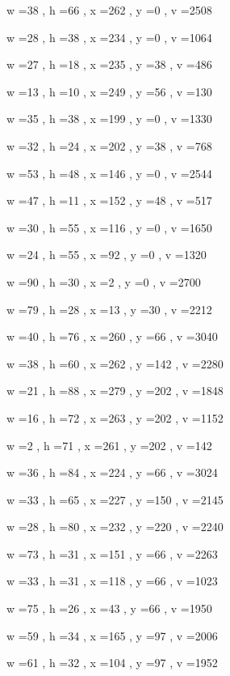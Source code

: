 \documentclass[11pt]{article}
\begin{document}
w =38 , h =66 , x =262 , y =0 , v =2508
\par
w =28 , h =38 , x =234 , y =0 , v =1064
\par
w =27 , h =18 , x =235 , y =38 , v =486
\par
w =13 , h =10 , x =249 , y =56 , v =130
\par
w =35 , h =38 , x =199 , y =0 , v =1330
\par
w =32 , h =24 , x =202 , y =38 , v =768
\par
w =53 , h =48 , x =146 , y =0 , v =2544
\par
w =47 , h =11 , x =152 , y =48 , v =517
\par
w =30 , h =55 , x =116 , y =0 , v =1650
\par
w =24 , h =55 , x =92 , y =0 , v =1320
\par
w =90 , h =30 , x =2 , y =0 , v =2700
\par
w =79 , h =28 , x =13 , y =30 , v =2212
\par
w =40 , h =76 , x =260 , y =66 , v =3040
\par
w =38 , h =60 , x =262 , y =142 , v =2280
\par
w =21 , h =88 , x =279 , y =202 , v =1848
\par
w =16 , h =72 , x =263 , y =202 , v =1152
\par
w =2 , h =71 , x =261 , y =202 , v =142
\par
w =36 , h =84 , x =224 , y =66 , v =3024
\par
w =33 , h =65 , x =227 , y =150 , v =2145
\par
w =28 , h =80 , x =232 , y =220 , v =2240
\par
w =73 , h =31 , x =151 , y =66 , v =2263
\par
w =33 , h =31 , x =118 , y =66 , v =1023
\par
w =75 , h =26 , x =43 , y =66 , v =1950
\par
w =59 , h =34 , x =165 , y =97 , v =2006
\par
w =61 , h =32 , x =104 , y =97 , v =1952
\par
\newpage
\end{document}
